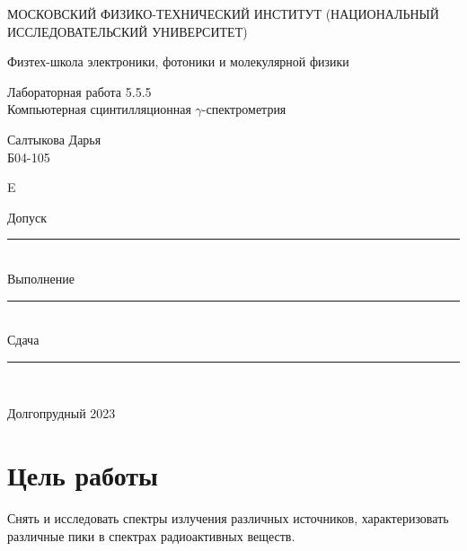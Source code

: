 \documentclass[a4paper,12pt]{article} %
\begin{document}
\newenvironment{lines}[1][\textwidth] %
{
\newcolumntype{E}{>{}p{#1}<{\hrulefill}} %
\begin{flushright} %
\begin{tabular}[h]{E} %
}
{\end{tabular}\end{flushright}
}
	
	\begin{titlepage}
	\begin{center}
		{\large МОСКОВСКИЙ ФИЗИКО-ТЕХНИЧЕСКИЙ ИНСТИТУТ (НАЦИОНАЛЬНЫЙ ИССЛЕДОВАТЕЛЬСКИЙ УНИВЕРСИТЕТ)}
	\end{center}
	\begin{center}
		{\large Физтех-школа электроники, фотоники и молекулярной физики}
	\end{center}
	
	
	\vspace{4.5cm}
	{\huge
		\begin{center}
			{Лабораторная работа 5.5.5}\\
			 Компьютерная сцинтилляционная $\gamma$-спектрометрия
		\end{center}
	}
	\vspace{2cm}
	\begin{flushright}
		{\LARGE Салтыкова Дарья \\
			\vspace{0.5cm}
			Б04-105}
	\end{flushright}
	
	\vspace{0.5cm}
	
	\begin{lines}[.5
	\textwidth]
  {\LARGE Допуск} \rule{6.5cm}{0.25pt} \vspace{0.5cm}\\
 {\LARGE Выполнение} \rule{3cm}{0.25pt}\vspace{0.5cm} \\ {\LARGE Сдача} \rule{3cm}{0.25pt} \\ %
\end{lines}
	\vspace{6cm}
	\begin{center}
		Долгопрудный 2023
	\end{center}
\end{titlepage}

\section{Цель работы}
Снять и исследовать спектры излучения различных источников, характеризовать различные пики в спектрах радиоактивных веществ.
\end{document}
